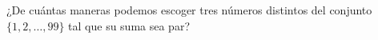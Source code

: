 \begin{statement}{9}
  ¿De cu\'antas maneras podemos escoger tres n\'umeros distintos del conjunto $\{1, 2, \dots, 99\}$
  tal que su suma sea par?
\end{statement}